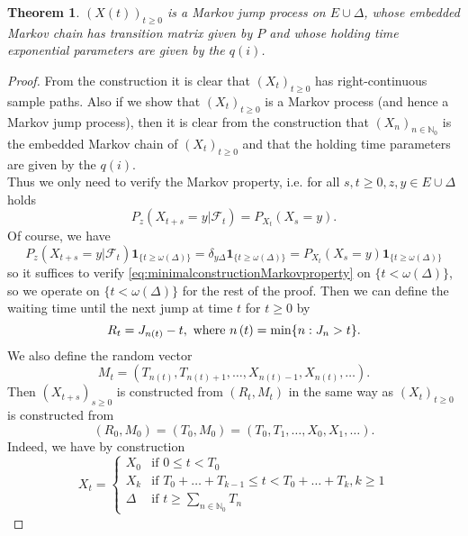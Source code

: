 \documentclass[12pt,a4paper]{scrartcl}
\newtheorem{theorem}{Theorem}[section]
\numberwithin{equation}{section}
\newcommand{\N}{\mathbb{N}} %
\begin{document}
\begin{theorem}
$\left(X\left(t\right)\right)_{t\geq 0}$ is a Markov jump process on $ E \cup \Delta $, whose embedded Markov chain has transition matrix given by $P$ and whose holding time exponential parameters are given by the $q\left(i\right)$.
\end{theorem}
\begin{proof}
From the construction it is clear that $\left(X_t\right)_{t \geq 0}$ has right-continuous sample paths. Also if we show that $\left(X_t\right)_{t \geq 0}$ is a Markov process (and hence a Markov jump process), then it is clear from the construction that $\left(X_n\right)_{n \in \N_0}$ is the embedded Markov chain of $\left(X_t\right)_{t \geq 0}$ and that the holding time parameters are given by the $q\left(i\right)$.\\
Thus we only need to verify the Markov property, i.e. for all $s,t \geq 0, z, y \in E \cup \Delta$ holds
\begin{equation} \label{eq:minimalconstructionMarkovproperty}
P_z\left(X_{t+s} = y | \mathcal{F}_t \right) = P_{X_t}\left(X_s = y \right).
\end{equation}
Of course, we have
\begin{equation*}
P_z\left(X_{t+s} = y | \mathcal{F}_t \right) \textbf{1}_{\lbrace t \geq \omega\left(\Delta\right) \rbrace} = \delta_{y\Delta} \textbf{1}_{\lbrace t \geq \omega\left(\Delta\right) \rbrace} = P_{X_t}\left(X_s = y \right) \textbf{1}_{\lbrace t \geq \omega\left(\Delta\right) \rbrace}
\end{equation*}
so it suffices to verify \eqref{eq:minimalconstructionMarkovproperty} on $\lbrace t < \omega\left(\Delta\right) \rbrace $, so we operate on $\lbrace t < \omega\left(\Delta\right) \rbrace $ for the rest of the proof. Then we can define the waiting time until the next jump at time $t$ for $ t \geq 0$ by 
$$ R_t = J_{n\left(t\right)} - t, \textnormal{ where } n\left(t\right) = \min\lbrace n: J_n > t \rbrace. $$
We also define the random vector
$$ M_t = \left(T_{n\left(t\right)},T_{n\left(t\right)+1},\ldots, X_{n\left(t\right)-1}, X_{n\left(t\right)}, \ldots \right). $$
Then $\left(X_{t+s} \right)_{s \geq 0}$ is constructed from $\left(R_t, M_t\right)$ in the same way as $\left(X_t\right)_{t \geq 0}$ is constructed from 
$$ \left(R_0, M_0\right) = \left(T_0, M_0\right) = \left(T_0, T_1, \ldots, X_0, X_1, \ldots \right). $$
Indeed, we have by construction
$$X_t = \begin{cases} X_0 & \mbox{if } 0 \leq t < T_0 \\ X_k &\mbox{if } T_0 + \ldots + T_{k-1} \leq t < T_0 + \ldots + T_k , k \geq 1 \\ \Delta &\mbox{if } t \geq \sum_{n \in \N_0} T_n  \end{cases}$$

\end{proof}
\end{document}
